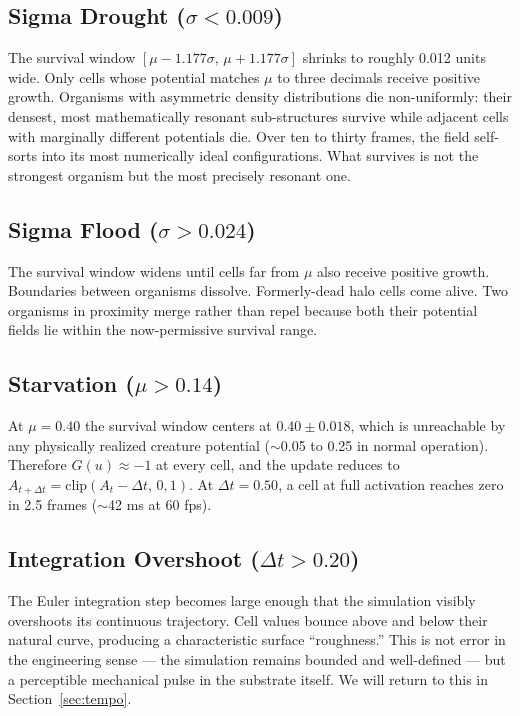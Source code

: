 \documentclass[11pt]{article}
\begin{document}
\subsection{Sigma Drought ($\sigma < 0.009$)}
The survival window $[\mu - 1.177\sigma,\, \mu + 1.177\sigma]$ shrinks to
roughly 0.012 units wide. Only cells whose potential matches $\mu$ to three
decimals receive positive growth. Organisms with asymmetric density
distributions die non-uniformly: their densest, most mathematically resonant
sub-structures survive while adjacent cells with marginally different
potentials die. Over ten to thirty frames, the field self-sorts into its
most numerically ideal configurations. What survives is not the strongest
organism but the most precisely resonant one.

\subsection{Sigma Flood ($\sigma > 0.024$)}
The survival window widens until cells far from $\mu$ also receive positive
growth. Boundaries between organisms dissolve. Formerly-dead halo cells come
alive. Two organisms in proximity merge rather than repel because both their
potential fields lie within the now-permissive survival range.

\subsection{Starvation ($\mu > 0.14$)}
At $\mu = 0.40$ the survival window centers at $0.40 \pm 0.018$, which is
unreachable by any physically realized creature potential ($\sim$0.05 to
0.25 in normal operation). Therefore $G(u) \approx -1$ at every cell, and
the update reduces to $A_{t+\Delta t} = \mathrm{clip}(A_t - \Delta t,\, 0,1)$.
At $\Delta t = 0.50$, a cell at full activation reaches zero in 2.5 frames
($\sim$42 ms at 60 fps).

\subsection{Integration Overshoot ($\Delta t > 0.20$)}
The Euler integration step becomes large enough that the simulation visibly
overshoots its continuous trajectory. Cell values bounce above and below
their natural curve, producing a characteristic surface ``roughness.'' This
is not error in the engineering sense --- the simulation remains bounded
and well-defined --- but a perceptible mechanical pulse in the substrate
itself. We will return to this in Section~\ref{sec:tempo}.
\end{document}
